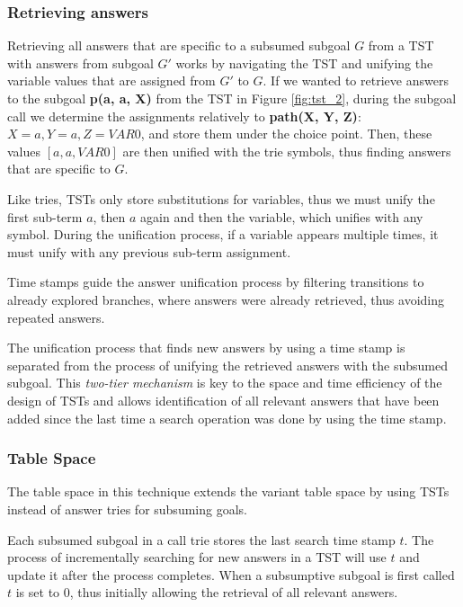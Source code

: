   \subsubsection{Retrieving answers}
  
  Retrieving all answers that are specific to a subsumed subgoal $G$ from a TST with answers from subgoal $G'$
  works by navigating the TST and unifying the variable values that are assigned from $G'$ to $G$.
  If we wanted to retrieve answers to the subgoal \textbf{p(a, a, X)} from the TST in Figure \ref{fig:tst_2},
  during the subgoal call we determine the assignments relatively to \textbf{path(X, Y, Z)}: $X = a, Y = a, Z = VAR0$,
  and store them under the choice point. Then, these values $[a, a, VAR0]$ are then unified
  with the trie symbols, thus finding answers that are specific to $G$.
  
  Like tries, TSTs only store substitutions for variables, thus we must unify
  the first sub-term $a$, then $a$ again and then the variable, which unifies with any symbol.
  During the unification process, if a variable appears multiple times, it must unify with
  any previous sub-term assignment.
  
  Time stamps guide the answer unification process by filtering transitions to already explored branches, where
  answers were already retrieved, thus avoiding repeated answers.
  
  The unification process that finds new answers by using a time stamp is separated from the process
  of unifying the retrieved answers with the subsumed subgoal. This \textit{two-tier mechanism} is key to the space and time
  efficiency of the design of TSTs \cite{Johnson-99} and allows identification of all relevant answers that have
  been added since the last time a search operation was done by using the time stamp.
  
  \subsubsection{Table Space}

  The table space in this technique extends the variant table space by
  using TSTs instead of answer tries for subsuming goals.
   
  Each subsumed subgoal in a call trie stores the last search time stamp $t$. The process of
  incrementally searching for new answers in a TST will use $t$ and update it after the process completes.
  When a subsumptive subgoal is first called $t$ is set to $0$, thus initially allowing the retrieval of all
  relevant answers.
  
